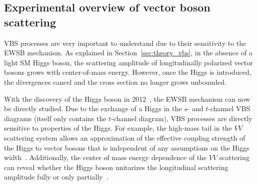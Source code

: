 \subsection{Experimental overview of vector boson scattering}\label{ssww13tev:vbs_theory}
VBS processes are very important to understand due to their sensitivity to the EWSB mechanism.
As explained in Section~\ref{sec:theory_vbs}, in the absence of a light SM Higgs boson, the scattering amplitude of longitudinally polarized vector bosons grows with center-of-mass energy.%
However, once the Higgs is introduced, the divergences cancel and the cross section no longer grows unbounded.%

% 

With the discovery of the Higgs boson in 2012~\cite{HIGG-2012-27, CMS-HIG-12-028}, the EWSB mechanism can now be directly studied.
Due to the exchange of a Higgs in the $s$- and $t$-channel VBS diagrams (\ssww itself only contains the $t$-channel diagram), VBS processes are directly sensitive to properties of the Higgs.
For example, the high-mass tail in the $VV$ scattering system allows an approximation of the effective coupling strength of the Higgs to vector bosons that is independent of any assumptions on the Higgs width~\cite{2015.higgs-constraints-from-vbs}.
Additionally, the center of mass energy dependence of the $VV$ scattering can reveal whether the Higgs boson unitarizes the longitudinal scattering amplitude fully or only partially~\cite{2014.higgs-WW-scattering-theory}.

